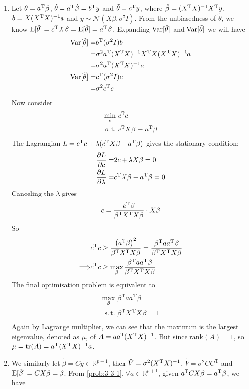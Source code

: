 \begin{sol}
\begin{enumerate}
\item
\label{prob:3-3-1}
Let $\theta=a^{\mathrm{T}}\beta$, $\hat{\theta}=a^{\mathrm{T}}\hat{\beta}=b^{\mathrm{T}}y$ and $\tilde{\theta}=c^{\mathrm{T}}y$, where $\hat{\beta}=(X^{\mathrm{T}}X)^{-1}X^{\mathrm{T}}y$, $b=X(X^{\mathrm{T}}X)^{-1}a$ and $y\sim\mathcal{N}(X\beta,\sigma^2I)$. From the unbiasedness of $\tilde{\theta}$, we know $\operatorname{E}[\tilde{\theta}]=c^{\mathrm{T}}X\beta=\operatorname{E}[\hat{\theta}]=a^{\mathrm{T}}\beta$. Expanding $\operatorname{Var}[\hat{\theta}]$ and $\operatorname{Var}[\tilde{\theta}]$ we will have
\begin{align*}
\operatorname{Var}[\hat{\theta}] =& b^{\mathrm{T}}(\sigma^2 I)b\\
=& \sigma^2 a^{\mathrm{T}}(X^{\mathrm{T}}X)^{-1}X^{\mathrm{T}}X(X^{\mathrm{T}}X)^{-1}a\\
=& \sigma^2 a^{\mathrm{T}}(X^{\mathrm{T}}X)^{-1}a\\
\operatorname{Var}[\tilde{\theta}] =& c^{\mathrm{T}}(\sigma^2 I)c\\
=& \sigma^2 c^{\mathrm{T}}c
\end{align*}
Now consider
\begin{align*}
\min_c \ & \Tr{c}c\\
\st & \Tr{c}X\beta=\Tr{a}\beta
\end{align*}
The Lagrangian $L=c^{\mathrm{T}}c+\lambda(c^{\mathrm{T}}X\beta-a^{\mathrm{T}}\beta)$ gives the stationary condition:
\begin{align*}
\frac{\partial L}{\partial c}=& 2c+\lambda X\beta=0\\
\frac{\partial L}{\partial \lambda}=& c^{\mathrm{T}}X\beta-a^{\mathrm{T}}\beta=0
\end{align*}
Canceling the $\lambda$ gives
\[
c=\frac{a^{\mathrm{T}}\beta}{\beta^{\mathrm{T}}X^{\mathrm{T}}X\beta}\cdot X\beta
\]
So
\begin{align*}
& c^{\mathrm{T}}c\ge \frac{\left(a^{\mathrm{T}}\beta\right)^2}{\beta^{\mathrm{T}}X^{\mathrm{T}}X\beta}=\frac{\beta^{\mathrm{T}}aa^{\mathrm{T}}\beta}{\beta^{\mathrm{T}}X^{\mathrm{T}}X\beta}\\
\Longrightarrow & c^{\mathrm{T}}c\ge \max_\beta \frac{\beta^{\mathrm{T}}aa^{\mathrm{T}}\beta}{\beta^{\mathrm{T}}X^{\mathrm{T}}X\beta}
\end{align*}
The final optimization problem is equivalent to
\begin{align*}
\max_\beta \ & \Tr{\beta}a\Tr{a}\beta\\
\st & \Tr{\beta}\Tr{X}X\beta=1
\end{align*}
Again by Lagrange multiplier, we can see that the maximum is the largest eigenvalue, denoted as $\mu$, of $A=aa^{\mathrm{T}}(X^{\mathrm{T}}X)^{-1}$. But since $\mathrm{rank}(A)=1$, so $\mu=\operatorname{tr}(A)=a^{\mathrm{T}}(X^{\mathrm{T}}X)^{-1}a$.
\item We similarly let $\tilde{\beta}=Cy\in\mathbb{R}^{p+1}$, then $\hat{V}=\sigma^2(X^{\mathrm{T}}X)^{-1}$, $\tilde{V}=\sigma^2CC^{\mathrm{T}}$ and $\operatorname{E}[\tilde{\beta}]=CX\beta=\beta$. From \ref{prob:3-3-1}, $\forall a\in\mathbb{R}^{p+1}$, given $a^{\mathrm{T}}CX\beta=a^{\mathrm{T}}\beta$, we have

\end{enumerate}
\end{sol}
